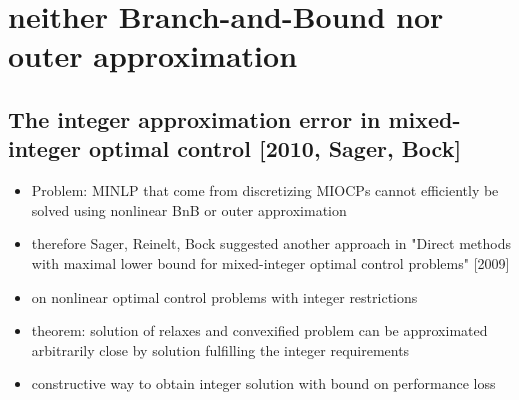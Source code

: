 \documentclass{article}
\begin{document}
\section{neither Branch-and-Bound nor outer approximation}
\subsection{The integer approximation error in mixed-integer optimal control [2010, Sager, Bock]}
\begin{itemize}
\item Problem: MINLP that come from discretizing MIOCPs cannot efficiently be solved using nonlinear BnB or outer approximation
\item therefore Sager, Reinelt, Bock suggested another approach in "Direct methods with maximal lower bound for mixed-integer optimal control problems" [2009]
\item on nonlinear optimal control problems with integer restrictions
\item theorem: solution of relaxes and convexified problem can be approximated arbitrarily close by solution fulfilling the integer requirements
\item constructive way to obtain integer solution with bound on performance loss
\end{itemize}
\end{document}
